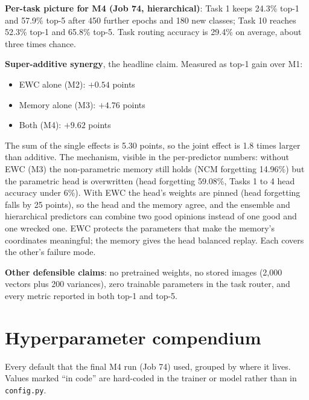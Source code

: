 \documentclass[11pt,a4paper]{article}
\newcommand{\code}[1]{\texttt{#1}}
\begin{document}
\textbf{Per-task picture for M4 (Job 74, hierarchical)}: Task 1 keeps 24.3\% top-1 and 57.9\% top-5 after 450 further epochs and 180 new classes; Task 10 reaches 52.3\% top-1 and 65.8\% top-5. Task routing accuracy is 29.4\% on average, about three times chance.

\textbf{Super-additive synergy}, the headline claim. Measured as top-1 gain over M1:
\begin{itemize}
  \item EWC alone (M2): $+0.54$ points
  \item Memory alone (M3): $+4.76$ points
  \item Both (M4): $+9.62$ points
\end{itemize}
The sum of the single effects is 5.30 points, so the joint effect is 1.8 times larger than additive. The mechanism, visible in the per-predictor numbers: without EWC (M3) the non-parametric memory still holds (NCM forgetting 14.96\%) but the parametric head is overwritten (head forgetting 59.08\%, Tasks 1 to 4 head accuracy under 6\%). With EWC the head's weights are pinned (head forgetting falls by 25 points), so the head and the memory agree, and the ensemble and hierarchical predictors can combine two good opinions instead of one good and one wrecked one. EWC protects the parameters that make the memory's coordinates meaningful; the memory gives the head balanced replay. Each covers the other's failure mode.

\textbf{Other defensible claims}: no pretrained weights, no stored images (2{,}000 vectors plus 200 variances), zero trainable parameters in the task router, and every metric reported in both top-1 and top-5.

\section{Hyperparameter compendium}

Every default that the final M4 run (Job 74) used, grouped by where it lives. Values marked ``in code'' are hard-coded in the trainer or model rather than in \code{config.py}.
\end{document}
